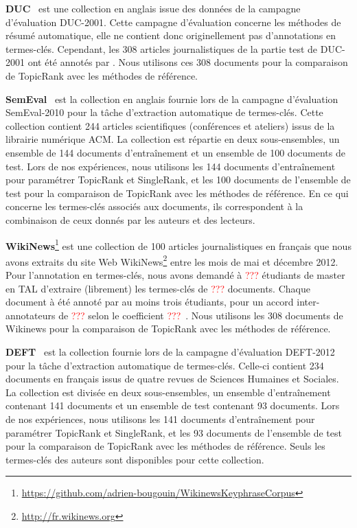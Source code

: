       \textbf{DUC}~\cite{over2001duc} est une collection en anglais issue des
      données de la campagne d'évaluation DUC-2001. Cette campagne d'évaluation
      concerne les méthodes de résumé automatique, elle ne contient donc
      originellement pas d'annotations en termes-clés. Cependant, les 308
      articles journalistiques de la partie test de DUC-2001 ont été annotés par
      . Nous utilisons ces 308 documents pour la
      comparaison de TopicRank avec les méthodes de référence.

      \textbf{SemEval}~\cite{kim2010semeval} est la collection en anglais
      fournie lors de la campagne d'évaluation SemEval-2010 pour la tâche
      d'extraction automatique de termes-clés. Cette collection contient 244
      articles scientifiques (conférences et ateliers) issus de la librairie
      numérique ACM. La collection est répartie en deux sous-ensembles, un
      ensemble de 144 documents d'entraînement et un ensemble de 100 documents
      de test. Lors de nos expériences, nous utilisons les 144 documents
      d'entraînement pour paramétrer TopicRank et SingleRank, et les 100
      documents de l'ensemble de test pour la comparaison de TopicRank avec les
      méthodes de référence. En ce qui concerne les termes-clés associés aux
      documents, ils correspondent à la combinaison de ceux donnés par les
      auteurs et des lecteurs.

      \textbf{WikiNews}\footnote{\url{https://github.com/adrien-bougouin/WikinewsKeyphraseCorpus}}
      est une collection de 100 articles journalistiques en français que nous
      avons extraits du site Web
      WikiNews\footnote{\url{http://fr.wikinews.org}} entre les mois de mai et
      décembre 2012. Pour l'annotation en termes-clés, nous avons demandé à \textcolor{red}{???}
      étudiants de master en TAL d'extraire (librement) les termes-clés de \textcolor{red}{???}
      documents. Chaque document à été annoté par au moins trois étudiants, pour
      un accord inter-annotateurs de \textcolor{red}{???} selon le coefficient
      \textcolor{red}{???}~\cite{doe1942paper}. Nous utilisons les 308 documents de Wikinews pour
      la comparaison de TopicRank avec les méthodes de référence.

      \textbf{DEFT}~\cite{paroubek2012deft} est la collection fournie lors de la
      campagne d'évaluation DEFT-2012 pour la tâche d'extraction automatique de
      termes-clés. Celle-ci contient 234 documents en français issus de quatre
      revues de Sciences Humaines et Sociales. La collection est divisée en deux
      sous-ensembles, un ensemble d'entraînement contenant 141 documents et un
      ensemble de test contenant 93 documents. Lors de nos expériences, nous
      utilisons les 141 documents d'entraînement pour paramétrer TopicRank et
      SingleRank, et les 93 documents de l'ensemble de test pour la comparaison
      de TopicRank avec les méthodes de référence. Seuls les termes-clés des
      auteurs sont disponibles pour cette collection.

